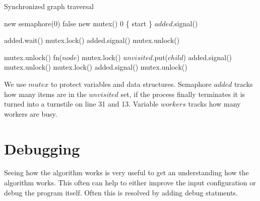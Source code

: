 \begin{algorithm}[H]
    \caption{Synchronized graph traversal}
\begin{algorithmic}[1]

             {new semaphore(0)}
         {false}
             {new mutex()}
           {0}
         {\{ start \}}
        \State $added$.signal()
        
        \Spawn
                \State added.wait()
                \State mutex.lock()
                    \State added.signal()
                    \State mutex.unlock()
                \EndIf

                \State mutex.unlock()
                \Statex
                \State fn($node$)
                \Statex
                    \State mutex.lock()
                        \State $unvisited$.put($child$)
                        \State added.signal()
                    \EndIf
                    \State mutex.unlock()
                \EndFor
                \Statex
                \State mutex.lock()
                    \State added.signal()
                \EndIf
                \State mutex.unlock()
            \EndWhile
        \EndSpawn

    \EndFunction
\end{algorithmic}
\end{algorithm}

We use $mutex$ to protect variables and data structures. Semaphore $added$ tracks how many items are in the $unvisited$ set, if the process finally terminates it is turned into a turnstile on line 31 and 13. Variable $workers$ tracks how many workers are busy.

\section{Debugging}

Seeing how the algorithm works is very useful to get an understanding how the algorithm works. This often can help to either improve the input configuration or debug the program itself. Often this is resolved by adding debug statments.

